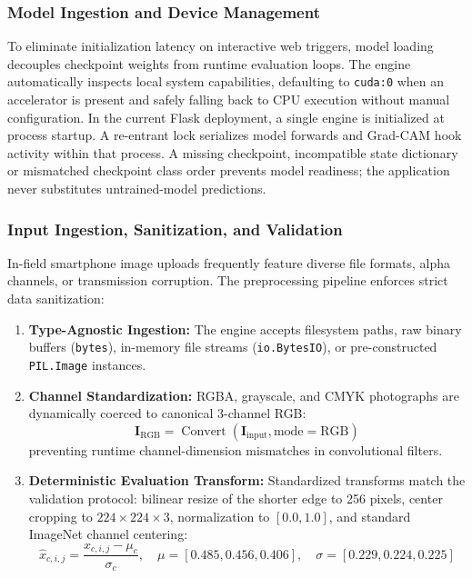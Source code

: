 \subsubsection{Model Ingestion and Device Management}
To eliminate initialization latency on interactive web triggers, model loading decouples checkpoint weights from runtime evaluation loops. The engine automatically inspects local system capabilities, defaulting to \texttt{cuda:0} when an accelerator is present and safely falling back to CPU execution without manual configuration. In the current Flask deployment, a single engine is initialized at process startup. A re-entrant lock serializes model forwards and Grad-CAM hook activity within that process. A missing checkpoint, incompatible state dictionary or mismatched checkpoint class order prevents model readiness; the application never substitutes untrained-model predictions.

\subsubsection{Input Ingestion, Sanitization, and Validation}
In-field smartphone image uploads frequently feature diverse file formats, alpha channels, or transmission corruption. The preprocessing pipeline enforces strict data sanitization:
\begin{enumerate}[leftmargin=*]
    \item \textbf{Type-Agnostic Ingestion:} The engine accepts filesystem paths, raw binary buffers (\texttt{bytes}), in-memory file streams (\texttt{io.BytesIO}), or pre-constructed \texttt{PIL.Image} instances.
    \item \textbf{Channel Standardization:} RGBA, grayscale, and CMYK photographs are dynamically coerced to canonical 3-channel RGB:
    \begin{equation}
        \mathbf{I}_{\text{RGB}} = \operatorname{Convert}(\mathbf{I}_{\text{input}}, \text{mode}=\text{RGB})
    \end{equation}
    preventing runtime channel-dimension mismatches in convolutional filters.
    \item \textbf{Deterministic Evaluation Transform:} Standardized transforms match the validation protocol: bilinear resize of the shorter edge to 256 pixels, center cropping to $224 \times 224 \times 3$, normalization to $[0.0, 1.0]$, and standard ImageNet channel centering:
    \begin{equation}
        \hat{x}_{c, i, j} = \frac{x_{c, i, j} - \mu_c}{\sigma_c}, \quad \mu = [0.485, 0.456, 0.406], \quad \sigma = [0.229, 0.224, 0.225]
    \end{equation}
\end{enumerate}

